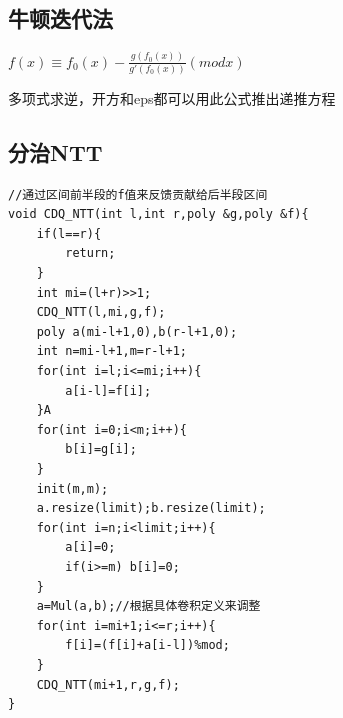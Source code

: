 \documentclass[12pt, a4paper, oneside]{ctexart}
\begin{document}
\newpage 
\subsection{牛顿迭代法} 
${f(x)\equiv{f_0(x)-{\frac{g(f_0(x))}{g'(f_0(x))}}}(mod x)}$

多项式求逆，开方和eps都可以用此公式推出递推方程

\newpage 
\subsection{分治NTT}
\begin{lstlisting}
//通过区间前半段的f值来反馈贡献给后半段区间
void CDQ_NTT(int l,int r,poly &g,poly &f){
    if(l==r){
        return;
    }
    int mi=(l+r)>>1;
    CDQ_NTT(l,mi,g,f);
    poly a(mi-l+1,0),b(r-l+1,0);
    int n=mi-l+1,m=r-l+1;
    for(int i=l;i<=mi;i++){
        a[i-l]=f[i];
    }A
    for(int i=0;i<m;i++){
        b[i]=g[i];
    }
    init(m,m);
    a.resize(limit);b.resize(limit);
    for(int i=n;i<limit;i++){
        a[i]=0;
        if(i>=m) b[i]=0;
    }
    a=Mul(a,b);//根据具体卷积定义来调整
    for(int i=mi+1;i<=r;i++){
        f[i]=(f[i]+a[i-l])%mod;
    }
    CDQ_NTT(mi+1,r,g,f);
}
\end{lstlisting}

\newpage 
\end{document}
